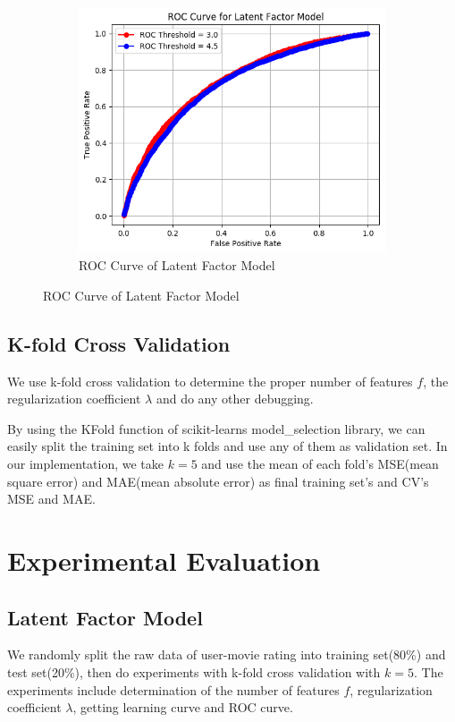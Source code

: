 \documentclass[10pt]{article}
\begin{document}
\begin{figure}[b]
    \begin{subfigure}{0.33\textwidth}
      \centering
      \includegraphics[width=1\textwidth]{ROC_Curve_for_Latent_Factor_Model}
      \caption{ROC Curve of Latent Factor Model}
      \label{fig:ROC}
    \end{subfigure}
\end{figure}

\subsection{K-fold Cross Validation}
We use k-fold cross validation to determine the proper number of features $f$, the regularization coefficient $\lambda$ and do any other debugging.

By using the KFold function of scikit-learns model\_selection library, we can easily split the training set into k folds and use any of them as validation set. In our implementation, we take $k=5$ and use the mean of each fold's MSE(mean square error) and MAE(mean absolute error) as final training set's and CV's MSE and MAE.

\section{Experimental Evaluation}

\subsection{Latent Factor Model}
We randomly split the raw data of user-movie rating into training set(80\%) and test set(20\%), then do experiments with k-fold cross validation with $k=5$.
The experiments include determination of the number of features $f$, regularization coefficient $\lambda$, getting learning curve and ROC curve.
\end{document}
